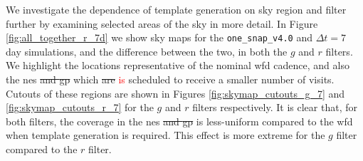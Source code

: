 \documentclass[preprintm,linenumbers]{aastex631}
\newcommand{\baseline}{\texttt{one\_snap\_v4.0}\xspace}
\providecommand{\red}[1]{\textcolor{red}{#1}}
\begin{document}
We investigate the dependence of template generation on sky region and filter further by examining selected areas of the sky in more detail.
In Figure \ref{fig:all_together_r_7d} we show sky maps for the \baseline and $\Delta t  =7$ day simulations, and the difference between the two, in both the $g$ and $r$ filters. 
We highlight the locations representative of the nominal \gls*{wfd} cadence, and also the \gls*{nes} \sout{and \gls*{gp}} which \sout{are} \red{is} scheduled to receive a smaller number of visits.
Cutouts of these regions are shown in Figures \ref{fig:skymap_cutouts_g_7} and \ref{fig:skymap_cutouts_r_7} for the $g$ and $r$ filters respectively.
It is clear that, for both filters, the coverage in the \gls*{nes} \sout{and \gls*{gp}} is less-uniform compared to the \gls*{wfd} when template generation is required.
This effect is more extreme for the $g$ filter compared to the $r$ filter.
\end{document}
